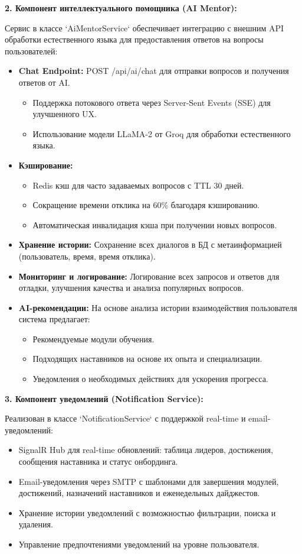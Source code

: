 \textbf{2. Компонент интеллектуального помощника (AI Mentor):}

Сервис в классе `AiMentorService` обеспечивает интеграцию с внешним API обработки естественного языка для предоставления ответов на вопросы пользователей:
\begin{itemize}
	\item \textbf{Chat Endpoint:} POST /api/ai/chat для отправки вопросов и получения ответов от AI.
	\begin{itemize}
		\item Поддержка потокового ответа через Server-Sent Events (SSE) для улучшенного UX.
		\item Использование модели LLaMA-2 от Groq для обработки естественного языка.
	\end{itemize}
	
	\item \textbf{Кэширование:}
	\begin{itemize}
		\item Redis кэш для часто задаваемых вопросов с TTL 30 дней.
		\item Сокращение времени отклика на 60\% благодаря кэшированию.
		\item Автоматическая инвалидация кэша при получении новых вопросов.
	\end{itemize}
	
	\item \textbf{Хранение истории:} Сохранение всех диалогов в БД с метаинформацией (пользователь, время, время отклика).
	
	\item \textbf{Мониторинг и логирование:} Логирование всех запросов и ответов для отладки, улучшения качества и анализа популярных вопросов.
	
	\item \textbf{AI-рекомендации:} На основе анализа истории взаимодействия пользователя система предлагает:
	\begin{itemize}
		\item Рекомендуемые модули обучения.
		\item Подходящих наставников на основе их опыта и специализации.
		\item Уведомления о необходимых действиях для ускорения прогресса.
	\end{itemize}
\end{itemize}

\textbf{3. Компонент уведомлений (Notification Service):}

Реализован в классе `NotificationService` с поддержкой real-time и email-уведомлений:
\begin{itemize}
	\item SignalR Hub для real-time обновлений: таблица лидеров, достижения, сообщения наставника и статус онбординга.
	\item Email-уведомления через SMTP с шаблонами для завершения модулей, достижений, назначений наставников и еженедельных дайджестов.
	\item Хранение истории уведомлений с возможностью фильтрации, поиска и удаления.
	\item Управление предпочтениями уведомлений на уровне пользователя.
\end{itemize}

